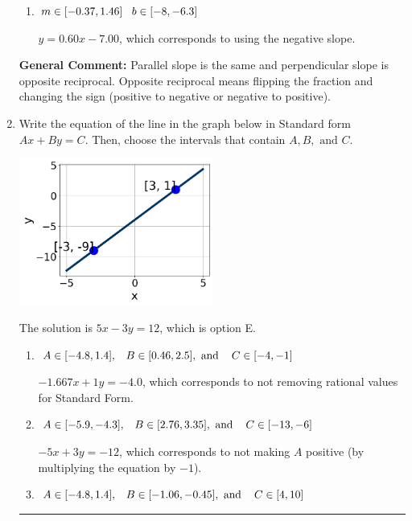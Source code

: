 \documentclass{extbook}[14pt]
\newcommand{\litem}[1]{\item #1

\rule{\textwidth}{0.4pt}}
\begin{document}
\begin{enumerate}
{\begin{enumerate}[label=\Alph*.]
 $y = -1.67x - 13.00$, which corresponds to using the reciprocal slope $(1/m)$.
\item \( m \in [-0.37, 1.46] \hspace*{3mm} b \in [-8, -6.3] \)

 $y = 0.60x - 7.00$, which corresponds to using the negative slope.
\end{enumerate}

\textbf{General Comment:} Parallel slope is the same and perpendicular slope is opposite reciprocal. Opposite reciprocal means flipping the fraction and changing the sign (positive to negative or negative to positive).
}
\litem{
Write the equation of the line in the graph below in Standard form $Ax+By=C$. Then, choose the intervals that contain $A, B, \text{ and } C$.

\begin{center}
    \includegraphics[width=0.5\textwidth]{../Figures/linearGraphToStandardB.png}
\end{center}




The solution is \( 5x - 3y = 12 \), which is option E.\begin{enumerate}[label=\Alph*.]
\item \( A \in [-4.8, 1.4], \hspace{3mm} B \in [0.46, 2.5], \text{ and } \hspace{3mm} C \in [-4, -1] \)

 $-1.667x + 1y = -4.0$, which corresponds to not removing rational values for Standard Form.
\item \( A \in [-5.9, -4.3], \hspace{3mm} B \in [2.76, 3.35], \text{ and } \hspace{3mm} C \in [-13, -6] \)

 $-5x + 3y = -12$, which corresponds to not making $A$ positive (by multiplying the equation by $-1$).
\item \( A \in [-4.8, 1.4], \hspace{3mm} B \in [-1.06, -0.45], \text{ and } \hspace{3mm} C \in [4, 10] \)


\end{enumerate}}
\end{enumerate}
\end{document}
